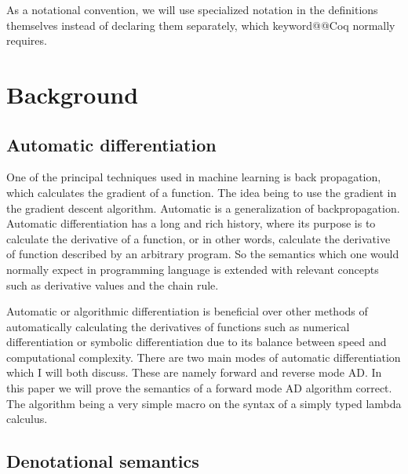 \documentclass[12pt, final]{article}
\makeatletter
\def\<#1>{\csname keyword@@#1\endcsname}
\makeatother
\begin{document}

As a notational convention, we will use specialized notation in the definitions themselves instead of declaring them separately, which \<Coq> normally requires.

\section{Background}

\subsection{Automatic differentiation}


One of the principal techniques used in machine learning is back propagation, which calculates the gradient of a function.
The idea being to use the gradient in the gradient descent algorithm\cite{Baydin2015AutomaticDI}.
Automatic is a generalization of backpropagation.
Automatic differentiation has a long and rich history, where its purpose is to calculate the derivative of a function, or in other words, calculate the derivative of function described by an arbitrary program.
So the semantics which one would normally expect in programming language is extended with relevant concepts such as derivative values and the chain rule.

Automatic or algorithmic differentiation is beneficial over other methods of automatically calculating the derivatives of functions such as numerical differentiation or symbolic differentiation due to its balance between speed and computational complexity.
There are two main modes of automatic differentiation which I will both discuss.
These are namely forward and reverse mode AD.
In this paper we will prove the semantics of a forward mode AD algorithm correct.
The algorithm being a very simple macro on the syntax of a simply typed lambda calculus.


\subsection{Denotational semantics}
\end{document}
